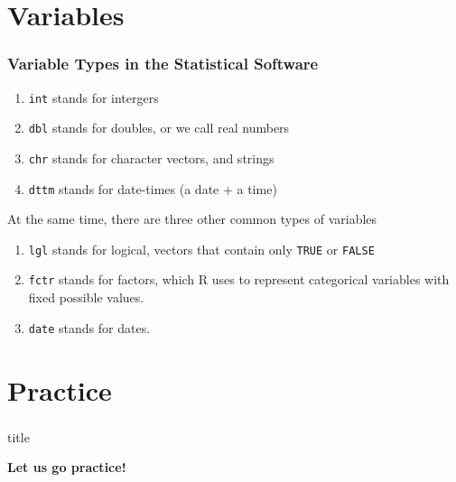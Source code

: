 \documentclass[11pt]{beamer}
\begin{document}
\section{Variables}
\begin{frame}

	\frametitle{\bfseries Variable Types in the Statistical Software}
	
	\begin{enumerate}
		\item \texttt{int} stands for intergers
		\item \texttt{dbl} stands for doubles, or we call real numbers
		\item \texttt{chr} stands for character vectors, and strings
		\item \texttt{dttm} stands for date-times (a date + a time)
	\end{enumerate}

At the same time, there are three other common types of variables
	\begin{enumerate}
		\item \texttt{lgl} stands for logical, vectors that contain only \texttt{TRUE} or \texttt{FALSE}
		\item \texttt{fctr} stands for factors, which R uses to represent categorical variables with fixed possible values.
		\item \texttt{date} stands for dates.
	\end{enumerate}
	
\end{frame}

\section{Practice}
	\begin{frame}
	\frametitle{\bfseries}
		\begin{beamercolorbox}{title}
		\begin{center}
			\bfseries \huge Let us go practice!
		\end{center}	
	\end{beamercolorbox}
	
	\end{frame}
\end{document}
